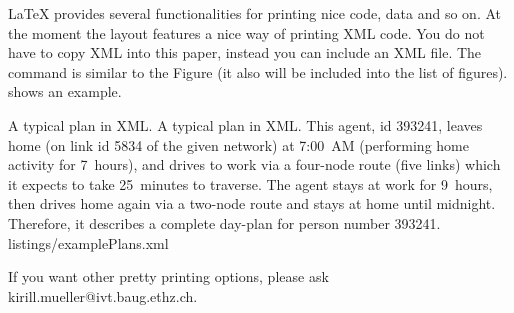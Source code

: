 \LaTeX{} provides several functionalities for printing nice code, data
and so on. At the moment the layout features a nice way of printing
XML code. You do not have to copy XML into this paper, instead you can
include an XML file.
The command is similar to the Figure (it also will be included into
the list of figures).  shows an example.

\createxmlfigure%
{A typical plan in XML.}%
{A typical plan in XML. This agent, id 393241, leaves home (on link
id 5834 of the given network) at 7:00~AM (performing home activity
for 7~hours), and drives to work via a four-node route (five links)
which it expects to take 25~minutes to traverse.  The agent stays at
work for 9~hours, then drives home again via a two-node route and
stays at home until midnight. Therefore, it describes a complete
day-plan for person number 393241.}%
{\label{fig:xml-plan}}%
{listings/examplePlans.xml}%
{}

If you want other pretty printing options, please ask
kirill.mueller@ivt.baug.ethz.ch.

